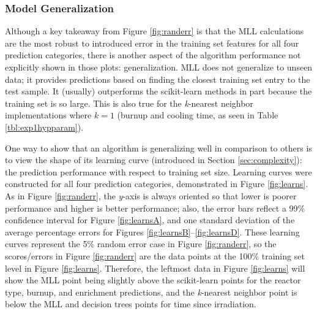 
\subsubsection{Model Generalization}

Although a key takeaway from Figure \ref{fig:randerr} is that the \gls{MLL}
calculations are the most robust to introduced error in the training set
features for all four prediction categories, there is another aspect of the
algorithm performance not explicitly shown in those plots: generalization.
\Gls{MLL} does not generalize to unseen data; it provides predictions based on
finding the closest training set entry to the test sample.  It (usually)
outperforms the scikit-learn methods in part because the training set is so
large. This is also true for the \textit{k}-nearest neighbor implementations
where $k=1$ (burnup and cooling time, as seen in Table \ref{tbl:exp1hypparam}).

One way to show that an algorithm is generalizing well in comparison to others
is to view the shape of its learning curve (introduced in Section
\ref{sec:complexity}): the prediction performance with respect to training set
size.  Learning curves were constructed for all four prediction categories,
demonstrated in Figure \ref{fig:learns}. As in Figure \ref{fig:randerr}, the
\textit{y}-axis is always oriented so that lower is poorer performance and
higher is better performance; also, the error bars reflect a 99\% confidence
interval for Figure \ref{fig:learnsA}, and one standard deviation of the
average percentage errors for Figures \ref{fig:learnsB}--\ref{fig:learnsD}.
These learning curves represent the 5\% random error case in Figure
\ref{fig:randerr}, so the scores/errors in Figure \ref{fig:randerr} are the
data points at the 100\% training set level in Figure \ref{fig:learns}.
Therefore, the leftmost data in Figure \ref{fig:learns} will show the \gls{MLL}
point being slightly above the scikit-learn points for the reactor type,
burnup, and enrichment predictions, and the \textit{k}-nearest neighbor point
is below the \gls{MLL} and decision trees points for time since irradiation.  

